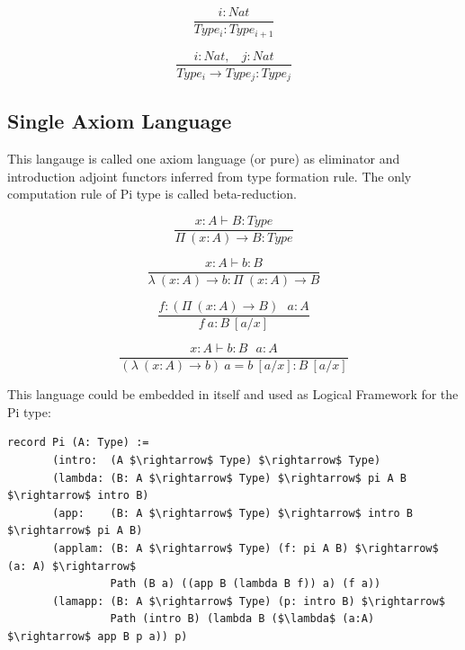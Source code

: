 \documentclass[11pt,oneside]{article}
\begin{document}
\begin{equation}
\tag{$A_2$}
\dfrac
{i: Nat}
{Type_i : Type_{i+1}}
\end{equation}

\begin{equation}
\tag{$R_2$}
\dfrac
{i : Nat,\ \ \ \ j : Nat}
{Type_i \rightarrow Type_{j} : Type_{j}}
\end{equation}

\subsection{Single Axiom Language}

This langauge is called one axiom language (or pure) as eliminator
and introduction adjoint functors inferred from type formation rule.
The only computation rule of Pi type is called beta-reduction.

\begin{equation}
\tag{$\Pi$-formation}
\dfrac
{x:A \vdash B : Type}
{\Pi\ (x:A) \rightarrow B : Type}
\end{equation}

\begin{equation}
\tag{$\lambda$-intro}
\dfrac
{x:A \vdash b : B}
{\lambda\ (x:A) \rightarrow b : \Pi\ (x: A) \rightarrow B }
\end{equation}

\begin{equation}
\tag{$App$-elimination}
\dfrac
{f: (\Pi\ (x:A) \rightarrow B)\ \ \ a: A}
{f\ a : B\ [a/x]}
\end{equation}

\begin{equation}
\tag{$\beta$-computation}
\dfrac
{x:A \vdash b: B\ \ \ a:A}
{(\lambda\ (x:A) \rightarrow b)\ a = b\ [a/x] : B\ [a/x]}
\end{equation}

\vspace{0.5cm}
This language could be embedded in itself and used
as Logical Framework for the Pi type:

\begin{lstlisting}[mathescape=true]
record Pi (A: Type) :=
       (intro:  (A $\rightarrow$ Type) $\rightarrow$ Type)
       (lambda: (B: A $\rightarrow$ Type) $\rightarrow$ pi A B $\rightarrow$ intro B)
       (app:    (B: A $\rightarrow$ Type) $\rightarrow$ intro B $\rightarrow$ pi A B)
       (applam: (B: A $\rightarrow$ Type) (f: pi A B) $\rightarrow$ (a: A) $\rightarrow$
                Path (B a) ((app B (lambda B f)) a) (f a))
       (lamapp: (B: A $\rightarrow$ Type) (p: intro B) $\rightarrow$
                Path (intro B) (lambda B ($\lambda$ (a:A) $\rightarrow$ app B p a)) p)

\end{lstlisting}
\end{document}
